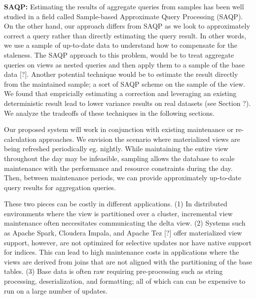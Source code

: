 \noindent\textbf{SAQP: }
Estimating the results of aggregate queries from samples has been
well studied in a field called Sample-based Approximate Query Processing
(SAQP). On the other hand, our approach differs from SAQP as we look to
approximately correct a query rather than directly estimating the query result.
In other words, we use a sample of up-to-date data to understand how to compensate for the
staleness. The SAQP approach to this problem, would be to treat aggregate
queries on views as nested queries and then apply them to a sample
of the base data {[}?{]}. Another potential technique would be to
estimate the result directly from the maintained sample; a sort of
SAQP scheme on the sample of the view. We found that empricially estimating
a correction and leveraging an existing deterministic result lead
to lower variance results on real datasets (see Section ?). We analyze
the tradeoffs of these techniques in the following sections.

\vspace{1em}

Our proposed system will work in conjunction with existing maintenance or re-calculation approaches.
We envision the scenario where materialized views are being refreshed periodically eg. nightly.
While maintaining the entire view throughout the day may be infeasible, sampling allows the database to scale maintenance with the performance and resource constraints during the day.
Then, between maintenance periods, we can provide approximately up-to-date query results for aggregation queries.









\iffalse
 These two pieces can be costly in different
applications. (1) In distributed environments where the view is partitioned
over a cluster, incremental view maintenance often neccesitates communicating
the delta view. (2) Systems such as Apache Spark, Cloudera Impala,
and Apache Tez {[}?{]} offer materialized view support, however, are
not optimized for selective updates nor have native support for indices.
This can lead to high maintenance costs in applications where the
views are derived from joins that are not aligned with the partitioning
of the base tables. (3) Base data is often raw requiring pre-processing
such as string processing, deserialization, and formatting; all of
which can can be expensive to run on a large number of updates. 



